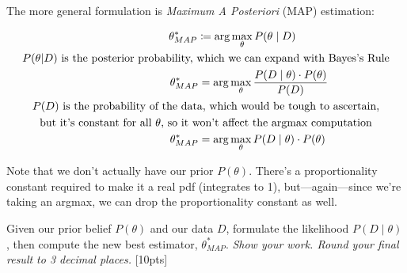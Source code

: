 \bigskip The more general formulation is \textit{Maximum A Posteriori} (MAP) estimation:

\begin{gather*}
    \mathllap{\theta^*_{MAP}} \coloneq \mathrlap{\arg\max_\theta P(\theta \mid D)} \\
    P(\theta | D)\text{ is the posterior probability, which we can expand with Bayes's Rule} \\
    \mathllap{\theta^*_{MAP}} = \mathrlap{\arg\max_\theta \frac{P(D \mid \theta)\cdot P(\theta)}{P(D)}} \\
    \text{$P(D)$ is the probability of the data, which would be tough to ascertain,} \\
    \text{but it's constant for all $\theta$, so it won't affect the argmax computation} \\
    \mathllap{\theta^*_{MAP}} = \mathrlap{\arg\max_\theta P(D \mid \theta)\cdot P(\theta)}
\end{gather*}
\begin{hintbox}
    Note that we don't actually have our prior $P(\theta)$. There's a proportionality constant required to make it a real pdf (integrates to 1), but—again—since we're taking an argmax, we can drop the proportionality constant as well.

\end{hintbox}

Given our prior belief $P(\theta)$ and our data $D$, formulate the likelihood $P(D\mid\theta)$, then compute the new best estimator, $\theta^*_{MAP}$. \emph{Show your work. Round your final result to 3 decimal places.} [10pts]
